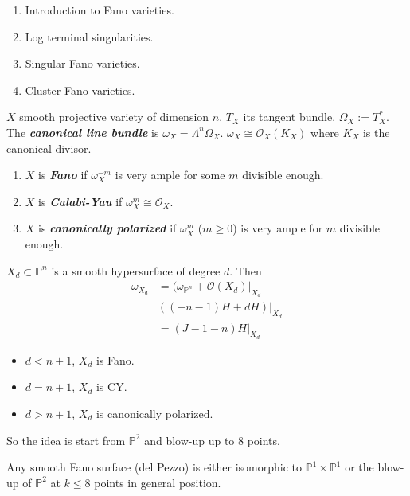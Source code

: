 \medskip{}

\begin{enumerate}
\item Introduction to Fano varieties.
\item Log terminal singularities.
\item Singular Fano varieties.
\item Cluster Fano varieties.
\end{enumerate}

\medskip{}

$X$ smooth projective variety of dimension
$n$. $T_{X}$ its tangent bundle.
$\Omega_{X}:=T^{*}_{X}$. The
\textit{\textbf{canonical line bundle}} is
$\omega_{X}=\Lambda^{n} \Omega_{X}$.
$\omega_{X}\cong \mathcal{O}_{X}(K_{X})$
where $K_{X}$ is the canonical divisor.

\medskip{}

\begin{enumerate}
\item $X$ is \textit{\textbf{Fano}} if
$\omega_{X}^{-m}$ is very ample for some $m$
divisible enough.
\item $X$ is \textit{\textbf{Calabi-Yau}} if
$\omega_{X}^{m} \cong  \mathcal{O}_{X}$.
\item $X$ is \textit{\textbf{canonically
polarized}} if $\omega_{X}^{m}$ ($m\geq 0$)
is very ample for $m$ divisible enough.
\end{enumerate}

\begin{example}
\label{example-moraga-1}
$X_{d}\subset \mathbb{P}^{n}$ is a smooth
hypersurface of degree $d$. Then
$$
\begin{aligned}
\omega_{X_{d}}&=(\omega_{\mathbb{P}^{n}}+
\mathcal{O}(X_{d})|_{X_{d}}\\
&((-n-1)H+dH)|_{X_{d}}\\
&=(J-1-n)H|_{X_{d}}
\end{aligned}
$$
\begin{itemize}
\item $d<n+1$,  $X_{d}$ is Fano.
\item $d=n+1$, $X_{d}$ is CY.
\item $d>n+1$,  $X_{d}$ is canonically
polarized.
\end{itemize}
\end{example}

So the idea is start from $\mathbb{P}^{2}$
and blow-up up to 8 points.

\begin{theorem}
\label{theorem-moraga-1}
Any smooth Fano surface (del Pezzo) is either
isomorphic to $\mathbb{P}^{1} \times
\mathbb{P}^{1}$ or the blow-up of
$\mathbb{P}^{2}$ at $k\leq 8$ points in
general position.
\end{theorem}

